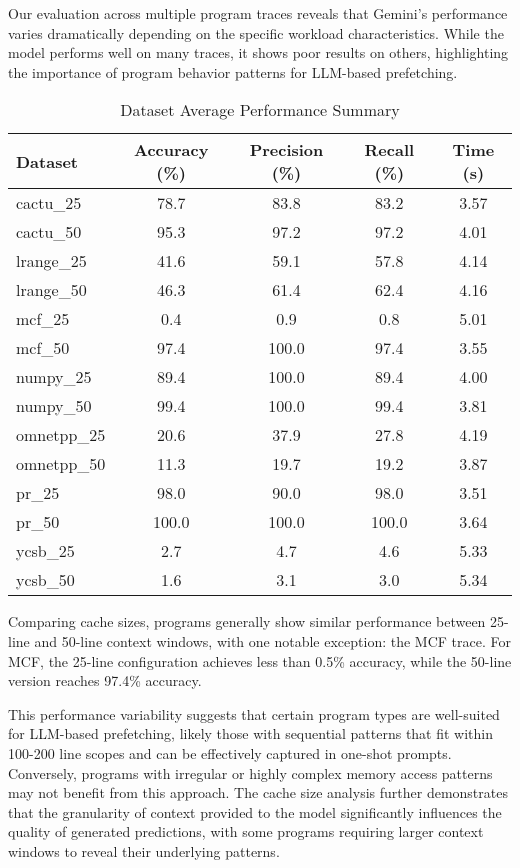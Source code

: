 \documentclass[sigconf,authorversion,nonacm]{acmart}
\begin{document}
Our evaluation across multiple program traces reveals that Gemini's performance varies dramatically depending on the specific workload characteristics. While the model performs well on many traces, it shows poor results on others, highlighting the importance of program behavior patterns for LLM-based prefetching.

\begin{table}[!htbp]
\centering
\caption{Dataset Average Performance Summary}
\label{tab:dataset-summary}
\small
\begin{tabular}{@{}lcccc@{}}
\toprule
\textbf{Dataset} & \textbf{Accuracy (\%)} & \textbf{Precision (\%)} & \textbf{Recall (\%)} & \textbf{Time (s)}\\
\midrule
cactu\_25 & 78.7 & 83.8 & 83.2 & 3.57 \\
cactu\_50 & 95.3 & 97.2 & 97.2 & 4.01 \\
\midrule
lrange\_25 & 41.6 & 59.1 & 57.8 & 4.14 \\
lrange\_50 & 46.3 & 61.4 & 62.4 & 4.16 \\
\midrule
mcf\_25 & 0.4 & 0.9 & 0.8 & 5.01 \\
mcf\_50 & 97.4 & 100.0 & 97.4 & 3.55 \\
\midrule
numpy\_25 & 89.4 & 100.0 & 89.4 & 4.00 \\
numpy\_50 & 99.4 & 100.0 & 99.4 & 3.81 \\
\midrule
omnetpp\_25 & 20.6 & 37.9 & 27.8 & 4.19 \\
omnetpp\_50 & 11.3 & 19.7 & 19.2 & 3.87 \\
\midrule
pr\_25 & 98.0 & 90.0 & 98.0 & 3.51 \\
pr\_50 & 100.0 & 100.0 & 100.0 & 3.64 \\
\midrule
ycsb\_25 & 2.7 & 4.7 & 4.6 & 5.33 \\
ycsb\_50 & 1.6 & 3.1 & 3.0 & 5.34 \\
\bottomrule
\end{tabular}
\end{table}

Comparing cache sizes, programs generally show similar performance between 25-line and 50-line context windows, with one notable exception: the MCF trace. For MCF, the 25-line configuration achieves less than 0.5\% accuracy, while the 50-line version reaches 97.4\% accuracy.

This performance variability suggests that certain program types are well-suited for LLM-based prefetching, likely those with sequential patterns that fit within 100-200 line scopes and can be effectively captured in one-shot prompts. Conversely, programs with irregular or highly complex memory access patterns may not benefit from this approach. The cache size analysis further demonstrates that the granularity of context provided to the model significantly influences the quality of generated predictions, with some programs requiring larger context windows to reveal their underlying patterns.
\end{document}
